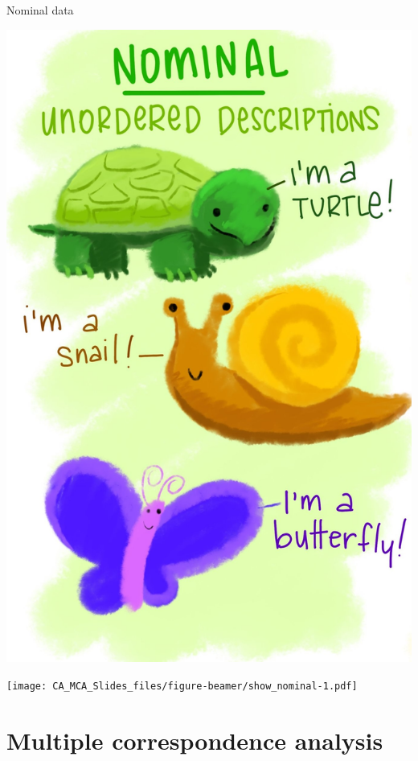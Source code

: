 \documentclass[
  ignorenonframetext,
]{beamer}
\begin{document}
\begin{frame}{Nominal data}
\protect\hypertarget{nominal-data}{}

\begin{center}
\includegraphics{../images/nom_copy.jpg}
\end{center}

\end{frame}

\begin{frame}

\texttt{[image: CA\_MCA\_Slides\_files/figure-beamer/show\_nominal-1.pdf]}

\end{frame}

\hypertarget{multiple-correspondence-analysis}{%
\section{Multiple correspondence
analysis}\label{multiple-correspondence-analysis}}
\end{document}
